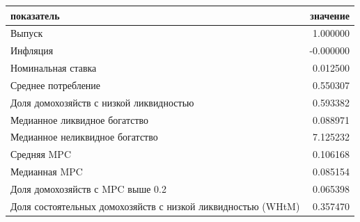 \begin{tabular}{lr}
\toprule
показатель & значение \\
\midrule
Выпуск & 1.000000 \\
Инфляция & -0.000000 \\
Номинальная ставка & 0.012500 \\
Среднее потребление & 0.550307 \\
Доля домохозяйств с низкой ликвидностью & 0.593382 \\
Медианное ликвидное богатство & 0.088971 \\
Медианное неликвидное богатство & 7.125232 \\
Средняя MPC & 0.106168 \\
Медианная MPC & 0.085154 \\
Доля домохозяйств с MPC выше 0.2 & 0.065398 \\
Доля состоятельных домохозяйств с низкой ликвидностью (WHtM) & 0.357470 \\
\bottomrule
\end{tabular}
